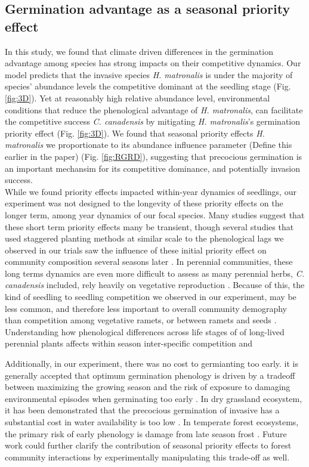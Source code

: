 \documentclass{article}\usepackage[]{graphicx}\usepackage[]{color}
\begin{document}
\subsection*{Germination advantage as a seasonal priority effect} 
In this study, we found that climate driven differences in the germination advantage among species has strong impacts on their competitive dynamics. Our model predicts that the invasive species \textit{H. matronalis} is under the majority of species' abundance levels the competitive dominant at the seedling stage (Fig. \ref{fig:3D}). Yet at reasonably high relative abundance level, environmental conditions that reduce the phenological advantage of \textit{H. matronalis}, can facilitate the competitive success \textit{C. canadensis} by mitigating \textit{H. matronalis}'s germination priority effect (Fig. \ref{fig:3D}). We found that seasonal priority effects \textit{H. matronalis} we proportionate to its abundance influence parameter (Define this earlier in the paper) (Fig. \ref{fig:RGRD}), suggesting that precocious germination is an important mechansim for its competitive dominance, and potentially invasion success.\\

While we found priority effects impacted within-year dynamics of seedlings, our experiment was not designed to the longevity of these priority effects on the longer term, among year dynamics of our focal species. Many studies suggest that these short term priority effects many be transient, though several studies that used staggered planting methods at similar scale to the phenological lags we observed in our trials saw the influence of these initial priority effect on community composition several seasons later \citep{}.  In perennial communities, these long terms dynamics are even more difficult to assess as many perennial herbs, \textit{C. canadensis} included, rely heavily on vegetative reproduction \citep{}. Because of this, the kind of seedling to seedling competition we observed in our experiment, may be less common, and therefore less important to overall community demography than competition among vegetative ramets, or between ramets and seeds \citep{}. Understanding how phenological differences across life stages of of long-lived perennial plants affects within season inter-specific competition and 

Additionally, in our experiment, there was no cost to germianting too early. it is generally accepted that optimum germination phenology is driven by a tradeoff between maximizing the growing season and the risk of exposure to damaging environmental episodes when germinating too early \citep{}. In dry grassland ecosystem, it has been demonstrated that the precocious germination of invasive has a substantial cost in water availability is too low \citep{}. In temperate forest ecosystems, the primary risk of early phenology is damage from late season frost \citep{}. Future work could further clarify the contribution of seasonal priority effects to forest community interactions by experimentally manipulating this trade-off as well.
\end{document}
